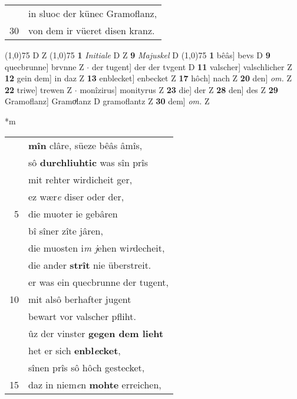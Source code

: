 \documentclass[8pt,a4paper,notitlepage]{article}
\begin{document}
\begin{table}[ht]
\begin{minipage}[t]{0.5\linewidth}
\begin{tabular}{rl}
 & in sluoc der künec Gramoflanz,\\ 
30 & von dem ir vüeret disen kranz.\\ 
\end{tabular}
\scriptsize
\line(1,0){75} \newline
D Z \newline
\line(1,0){75} \newline
\textbf{1} \textit{Initiale} D Z  \textbf{9} \textit{Majuskel} D  \newline
\line(1,0){75} \newline
\textbf{1} bêâs] bevs D \textbf{9} quecbrunne] brvnne Z  $\cdot$ der tugent] der der tvgent D \textbf{11} valscher] valschlicher Z \textbf{12} gein dem] in daz Z \textbf{13} enblecket] enbecket Z \textbf{17} hôch] nach Z \textbf{20} den] \textit{om.} Z \textbf{22} triwe] trewen Z  $\cdot$ monîzirus] monityrus Z \textbf{23} die] der Z \textbf{28} den] des Z \textbf{29} Gramoflanz] Gramoͮlanz D gramoflantz Z \textbf{30} dem] \textit{om.} Z \newline
\end{minipage}
\hspace{0.5cm}
\begin{minipage}[t]{0.5\linewidth}
\small
\begin{center}*m
\end{center}
\begin{tabular}{rl}
 & \textbf{mîn} clâre, süeze bêâs âmîs,\\ 
 & sô \textbf{durchliuhtic} was sîn prîs\\ 
 & mit rehter wirdicheit ger,\\ 
 & ez wær\textit{e} diser oder der,\\ 
5 & die muoter ie gebâren\\ 
 & bî sîner zîte jâren,\\ 
 & die muosten i\textit{m j}ehen wi\textit{r}decheit,\\ 
 & die ander \textbf{strît} nie überstreit.\\ 
 & er was ein quecbrunne der tugent,\\ 
10 & mit alsô berhafter jugent\\ 
 & bewart vor valscher pfliht.\\ 
 & ûz der vinster \textbf{gegen dem lieht}\\ 
 & het er sich \textbf{enbl\textit{e}cket},\\ 
 & sînen prîs sô hôch gestecket,\\ 
15 & daz in niem\textit{e}n \textbf{mohte} erreichen,\\ 

\end{tabular}
\end{minipage}
\end{table}
\end{document}
